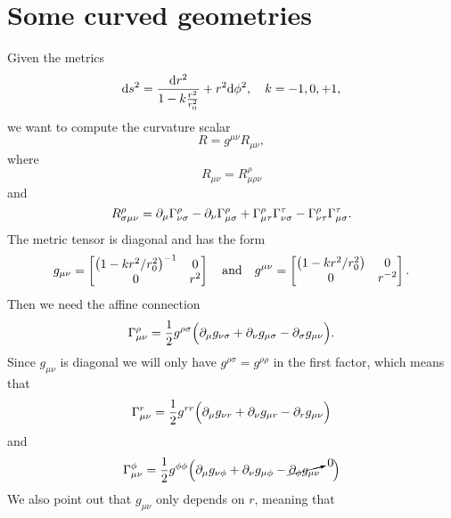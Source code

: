 \documentclass[11pt,a4paper, 
swedish, english %
]{article}
\begin{document}
\section{Some curved geometries}
\label{sec:geometries}
\swapcommands{\phi}{\varphi}
Given the metrics
\begin{equation}\label{eq8:ds2}
\rd{s}^2=\frac{\rd{r}^2}{1-k\frac{r^2}{r_0^2}}+r^2\rd\phi^2
\qc k=-1,0,+1,
\end{equation}
we want to compute the curvature scalar
\begin{equation}
R=g^{\mu\nu}R_{\mu\nu},
\end{equation}
where
\begin{equation}
R_{\mu\nu}=R^{\rho}_{\mu\rho\nu}
\end{equation}
and
\begin{equation}
R^{\rho}_{\sigma\mu\nu}
=\partial_\mu\Gamma^{\rho}_{\nu\sigma}-\partial_\nu\Gamma^{\rho}_{\mu\sigma}
+\Gamma^\rho_{\mu\tau}\Gamma^\tau_{\nu\sigma}
-\Gamma^\rho_{\nu\tau}\Gamma^\tau_{\mu\sigma}.
\end{equation}
The metric tensor is diagonal and has the form
\begin{equation}\label{eq8:g}
g_{\mu\nu}=
\begin{bmatrix}
\qty(1-kr^2/r_0^2)^{-1}&0\\
0&r^{2}
\end{bmatrix}
\qand
g^{\mu\nu}=
\begin{bmatrix}
\qty(1-kr^2/r_0^2)&0\\
0&r^{-2}
\end{bmatrix}.
\end{equation}
Then we need the affine connection
\begin{equation}
\Gamma^\rho_{\mu\nu}=\frac{1}{2}g^{\rho\sigma}
\Big(
\partial_{\mu}g_{\nu\sigma} +\partial_{\nu}g_{\mu\sigma} -\partial_{\sigma}g_{\mu\nu}
\Big).
\end{equation}
Since $g_{\mu\nu}$ is diagonal we will only have
$g^{\rho\sigma}=g^{\rho\rho}$ in the first factor, which means that
\begin{equation}
\Gamma^r_{\mu\nu}=\frac{1}{2}g^{rr}
\Big(
\partial_{\mu}g_{\nu r} +\partial_{\nu}g_{\mu r} -\partial_{r}g_{\mu\nu}
\Big)
\end{equation}
and
\begin{equation}
\Gamma^\phi_{\mu\nu}=\frac{1}{2}g^{\phi\phi}
\Big(
\partial_{\mu}g_{\nu \phi} +\partial_{\nu}g_{\mu \phi}
-\cancelto{0}{\partial_{\phi}g_{\mu\nu}}\hspace{1em}
\Big)
\end{equation}
We also point out that $g_{\mu\nu}$ only depends on $r$, meaning that
\end{document}
